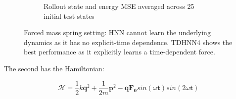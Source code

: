 \documentclass[twoside]{article}
\begin{document}
\begin{figure}[h!]
\begin{subfigure}[b]{0.48\textwidth}
		\caption{Rollout state and energy MSE averaged across 25 initial test states}
	\end{subfigure}
\caption{Forced mass spring setting: HNN cannot learn the underlying dynamics as it has no explicit-time dependence. TDHNN4 shows the best performance as it explicitly learns a time-dependent force.}
\label{fig.fmspring1}
\end{figure}

The second has the Hamiltonian:

\begin{equation}
\mathcal{H} = \frac{1}{2}k\mathbf{q}^2 + \frac{1}{2m}\mathbf{p}^2 - \mathbf{q}\mathbf{F_0}sin(\omega \mathbf{t})sin(2\omega \mathbf{t})
\end{equation}

\begin{figure}[h!]
\centering


\end{figure}
\end{document}
